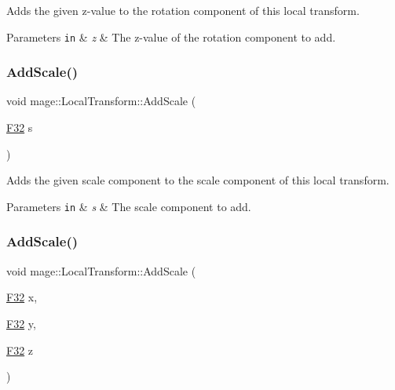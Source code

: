 Adds the given z-\/value to the rotation component of this local transform.


\begin{DoxyParams}[1]{Parameters}
\mbox{\tt in}  & {\em z} & The z-\/value of the rotation component to add. \\
\hline
\end{DoxyParams}
\hypertarget{classmage_1_1_local_transform_a7c7c84c097157d87bcd3c1d58fc6f8df}{}\label{classmage_1_1_local_transform_a7c7c84c097157d87bcd3c1d58fc6f8df} 
\subsubsection{\texorpdfstring{Add\+Scale()}{AddScale()}\hspace{0.1cm}{\footnotesize\ttfamily [1/4]}}
{\footnotesize\ttfamily void mage\+::\+Local\+Transform\+::\+Add\+Scale (\begin{DoxyParamCaption}\item[{\hyperlink{namespacemage_aa97e833b45f06d60a0a9c4fc22ae02c0}{F32}}]{s }\end{DoxyParamCaption})\hspace{0.3cm}{\ttfamily [noexcept]}}

Adds the given scale component to the scale component of this local transform.


\begin{DoxyParams}[1]{Parameters}
\mbox{\tt in}  & {\em s} & The scale component to add. \\
\hline
\end{DoxyParams}
\hypertarget{classmage_1_1_local_transform_a8de03038d4455846983ccf5b7a0cb08d}{}\label{classmage_1_1_local_transform_a8de03038d4455846983ccf5b7a0cb08d} 
\subsubsection{\texorpdfstring{Add\+Scale()}{AddScale()}\hspace{0.1cm}{\footnotesize\ttfamily [2/4]}}
{\footnotesize\ttfamily void mage\+::\+Local\+Transform\+::\+Add\+Scale (\begin{DoxyParamCaption}\item[{\hyperlink{namespacemage_aa97e833b45f06d60a0a9c4fc22ae02c0}{F32}}]{x,  }\item[{\hyperlink{namespacemage_aa97e833b45f06d60a0a9c4fc22ae02c0}{F32}}]{y,  }\item[{\hyperlink{namespacemage_aa97e833b45f06d60a0a9c4fc22ae02c0}{F32}}]{z }\end{DoxyParamCaption})\hspace{0.3cm}{\ttfamily [noexcept]}}

